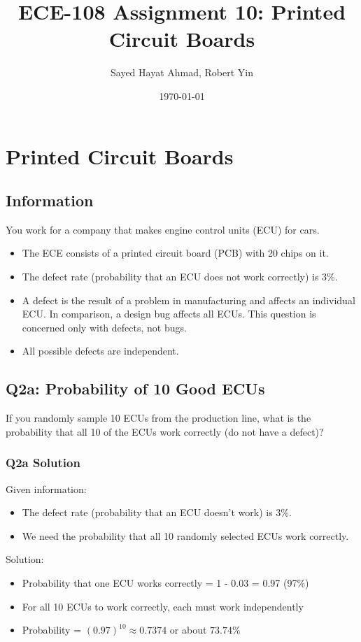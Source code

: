 \documentclass{article}
\title{ECE-108 Assignment 10: Printed Circuit Boards}
\author{Sayed Hayat Ahmad, Robert Yin}
\date{\today}
\begin{document}
\maketitle

\section{Printed Circuit Boards}

\subsection*{Information}

You work for a company that makes engine control units (ECU) for cars.  

\begin{itemize}
    \item The ECE consists of a printed circuit board (PCB) with 20 chips on it.  
    \item The defect rate (probability that an ECU does not work correctly) is 3\%.  
    \item A defect is the result of a problem in manufacturing and affects an individual ECU. In comparison, a design bug affects all ECUs. This question is concerned only with defects, not bugs.
    \item All possible defects are independent.
\end{itemize}

\subsection*{Q2a: Probability of 10 Good ECUs}

If you randomly sample 10 ECUs from the production line, what is the probability that all 10 of the ECUs work correctly (do not have a defect)?

\subsubsection*{Q2a Solution}

Given information:
\begin{itemize}
    \item The defect rate (probability that an ECU doesn't work) is 3\%.
    \item We need the probability that all 10 randomly selected ECUs work correctly.
\end{itemize}

Solution:
\begin{itemize}
    \item Probability that one ECU works correctly = 1 - 0.03 = 0.97 (97\%)
    \item For all 10 ECUs to work correctly, each must work independently
    \item Probability = $(0.97)^{10} \approx 0.7374$ or about $73.74\%$
\end{itemize}
\end{document}
